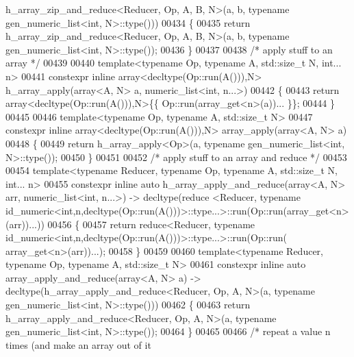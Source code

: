\begin{DoxyCode}
      h\_array\_zip\_and\_reduce<Reducer, Op, A, B, N>(a, b, \textcolor{keyword}{typename} gen\_numeric\_list<int, N>::type()))
00434 \{
00435   \textcolor{keywordflow}{return} h\_array\_zip\_and\_reduce<Reducer, Op, A, B, N>(a, b, \textcolor{keyword}{typename} gen\_numeric\_list<int, N>::type());
00436 \}
00437 
00438 \textcolor{comment}{/* apply stuff to an array */}
00439 
00440 \textcolor{keyword}{template}<\textcolor{keyword}{typename} Op, \textcolor{keyword}{typename} A, std::size\_t N, \textcolor{keywordtype}{int}... n>
00441 constexpr \textcolor{keyword}{inline} array<decltype(Op::run(A())),N> h\_array\_apply(array<A, N> a, numeric\_list<int, n...>)
00442 \{
00443   \textcolor{keywordflow}{return} array<decltype(Op::run(A())),N>\{\{ Op::run(array\_get<n>(a))... \}\};
00444 \}
00445 
00446 \textcolor{keyword}{template}<\textcolor{keyword}{typename} Op, \textcolor{keyword}{typename} A, std::\textcolor{keywordtype}{size\_t} N>
00447 constexpr \textcolor{keyword}{inline} array<decltype(Op::run(A())),N> array\_apply(array<A, N> a)
00448 \{
00449   \textcolor{keywordflow}{return} h\_array\_apply<Op>(a, \textcolor{keyword}{typename} gen\_numeric\_list<int, N>::type());
00450 \}
00451 
00452 \textcolor{comment}{/* apply stuff to an array and reduce */}
00453 
00454 \textcolor{keyword}{template}<\textcolor{keyword}{typename} Reducer, \textcolor{keyword}{typename} Op, \textcolor{keyword}{typename} A, std::size\_t N, \textcolor{keywordtype}{int}... n>
00455 constexpr \textcolor{keyword}{inline} \textcolor{keyword}{auto} h\_array\_apply\_and\_reduce(array<A, N> arr, numeric\_list<int, n...>) -> decltype(reduce
      <Reducer, \textcolor{keyword}{typename} id\_numeric<\textcolor{keywordtype}{int},n,decltype(Op::run(A()))>::type...>::run(Op::run(array\_get<n>(arr))...))
00456 \{
00457   \textcolor{keywordflow}{return} reduce<Reducer, typename id\_numeric<int,n,decltype(Op::run(A()))>::type...>::run(Op::run(
      array\_get<n>(arr))...);
00458 \}
00459 
00460 \textcolor{keyword}{template}<\textcolor{keyword}{typename} Reducer, \textcolor{keyword}{typename} Op, \textcolor{keyword}{typename} A, std::\textcolor{keywordtype}{size\_t} N>
00461 constexpr \textcolor{keyword}{inline} \textcolor{keyword}{auto} array\_apply\_and\_reduce(array<A, N> a) -> decltype(h\_array\_apply\_and\_reduce<Reducer,
       Op, A, N>(a, \textcolor{keyword}{typename} gen\_numeric\_list<int, N>::type()))
00462 \{
00463   \textcolor{keywordflow}{return} h\_array\_apply\_and\_reduce<Reducer, Op, A, N>(a, \textcolor{keyword}{typename} gen\_numeric\_list<int, N>::type());
00464 \}
00465 
00466 \textcolor{comment}{/* repeat a value n times (and make an array out of it}

\end{DoxyCode}
